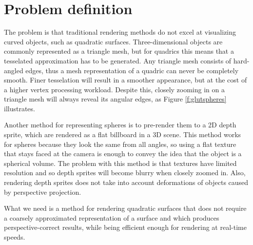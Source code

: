 \section{Problem definition}
The problem is that traditional rendering methods do not excel at visualizing curved objects, such as quadratic surfaces.
Three-dimensional objects are commonly represented as a triangle mesh, but for quadrics this means that a tesselated approximation has to be generated. 
Any triangle mesh consists of hard-angled edges, thus a mesh representation of a quadric can never be completely smooth.
Finer tesselation will result in a smoother appearance, but at the cost of a higher vertex processing workload.
Despite this, closely zooming in on a triangle mesh will always reveal its angular edges, as Figure \ref{f:glutspheres} illustrates.

Another method for representing spheres is to pre-render them to a 2D depth sprite, which are rendered as a flat billboard in a 3D scene.
This method works for spheres because they look the same from all angles, so using a flat texture that stays faced at the camera is enough to convey the idea that the object is a spherical volume.
The problem with this method is that textures have limited resolution and so depth sprites will become blurry when closely zoomed in.
Also, rendering depth sprites does not take into account deformations of objects caused by perspective projection.

What we need is a method for rendering quadratic surfaces that does not require a coarsely approximated representation of a surface and which produces perspective-correct results, 
while being efficient enough for rendering at real-time speeds.

